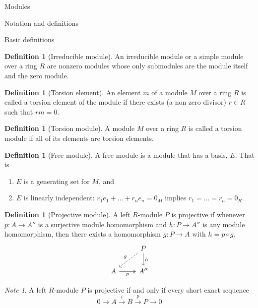 \documentclass{article}
\theoremstyle{definition}
\numberwithin{theorem}{subsection} %
\theoremstyle{remark}
\newtheorem*{remark}{Note}
\theoremstyle{definition}
\newtheorem{definition}[paragraph]{Definition}
\newcommand{\fn}[3]{{#1 \colon #2 \rightarrow #3}}
\begin{document}
\begin{section}{Modules}
  \begin{subsection}{Notation and definitions}
    \begin{subsubsection}{Basic definitions}
      \begin{definition}[Irreducible module]
        An irreducible module or a simple module over a ring $R$ are
        nonzero modules whose only submodules are the module itself and the zero
        module.
      \end{definition}
      \begin{definition}[Torsion element]
        An element $m$ of a module $M$ over a ring $R$ is called a torsion element
        of the module if there exists (a non zero divisor) $r \in R$ such that
        $rm = 0$.
      \end{definition}
      \begin{definition}[Torsion module]
        A module $M$ over a ring $R$ is called a torsion module if all of its
        elements are torsion elements.
      \end{definition}
      \begin{definition}[Free module]
        A free module is a module that has a basis, $E$. That is \begin{enumerate}
          \item $E$ is a generating set for $M$, and
          \item $E$ is linearly independent: $r_1e_1 + \hdots + r_ne_n = 0_M$
          implies $r_1 = \hdots = r_n = 0_R$.
        \end{enumerate}
      \end{definition}
      \begin{definition}[Projective module]
        A left $R$-module $P$ is projective if whenever $\fn p A {A''}$ is
        a surjective module homomorphism and $\fn h P {A''}$ is any module
        homomorphism, then there exists a homomorphism $\fn g P A$
        with $h = p \circ g$. \[
          \begin{tikzcd}
            & P \arrow[dl, dashrightarrow, "g", swap] \arrow[d, "h"] \\
            A \arrow[r, twoheadrightarrow, "p", swap] & A''
          \end{tikzcd}
        \]
      \end{definition}
      \begin{remark}
        A left $R$-module $P$ is projective if and only if every short exact
        sequence \[
          0 \rightarrow A \xrightarrow{i} B  \xrightarrow{p} P \longrightarrow 0
\]
\end{remark}
\end{subsubsection}
\end{subsection}
\end{section}
\end{document}
